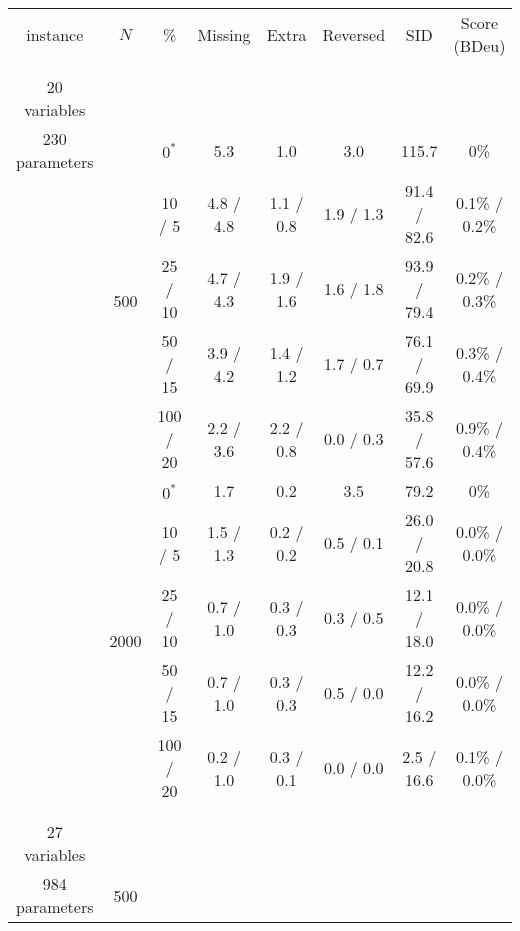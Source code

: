 \documentclass[twoside,11pt]{article}
\begin{document}
\begin{table}[H]
\scriptsize
\centering
\renewcommand\theadfont{}
\begin{tabular}{ c | c | c || c | c | c | c | c  }

instance & $N$ & \% & Missing & Extra & Reversed & SID & Score (BDeu) \\

\hhline{=|=|=||=|=|=|=|=}

\multirow{10}{*}{\thead{\textbf{child} \\ \\ 20 variables \\ 230 parameters}}  & \multirow{5}{*}{500}

& $0^*$ & 5.3 & 1.0 & 3.0 & 115.7 & 0\% \\
& & 10 / 5 & 4.8 / 4.8 & 1.1 / 0.8 & 1.9 / 1.3 & 91.4 / 82.6 & 0.1\% / 0.2\% \\
& & 25 / 10 & 4.7 / 4.3 & 1.9 / 1.6 & 1.6 / 1.8 & 93.9 / 79.4 & 0.2\% / 0.3\% \\
& & 50 / 15 & 3.9 / 4.2 & 1.4 / 1.2 & 1.7 / 0.7 & 76.1 / 69.9 & 0.3\% / 0.4\% \\
& & 100 / 20 & 2.2 / 3.6 & 2.2 / 0.8 & 0.0 / 0.3 & 35.8 / 57.6 & 0.9\% / 0.4\% \\


\hhline{~|-|-||-|-|-|-|-}

& \multirow{5}{*}{2000}

& $0^*$ & 1.7 & 0.2 & 3.5 & 79.2 & 0\% \\
& & 10 / 5 & 1.5 / 1.3 & 0.2 / 0.2 & 0.5 / 0.1 & 26.0 / 20.8 & 0.0\% / 0.0\% \\
& & 25 / 10 & 0.7 / 1.0 & 0.3 / 0.3 & 0.3 / 0.5 & 12.1 / 18.0 & 0.0\% / 0.0\% \\
& & 50 / 15 & 0.7 / 1.0 & 0.3 / 0.3 & 0.5 / 0.0 & 12.2 / 16.2 & 0.0\% / 0.0\% \\
& & 100 / 20 & 0.2 / 1.0 & 0.3 / 0.1 & 0.0 / 0.0 & 2.5 / 16.6 & 0.1\% / 0.0\% \\

\hhline{=|=|=||=|=|=|=|=}

\multirow{10}{*}{\thead{\textbf{insurance} \\ \\ 27 variables \\ 984 parameters}} & \multirow{5}{*}{500}


\end{tabular}
\end{table}
\end{document}

